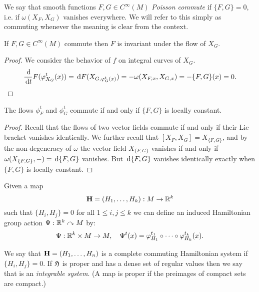 \begin{dfn}
    We say that smooth functions $F,G\in C^\infty(M)$ \emph{Poisson commute} if $\{F,G\}=0$, i.e. if $\omega(X_F,X_G)$ vanishes everywhere.
    We will refer to this simply as commuting whenever the meaning is clear from the context.
\end{dfn}

\begin{lem}
    If $F,G\in C^\infty(M)$ commute then $F$ is invariant under the flow of $X_G$.
\end{lem}

\begin{proof}
    We consider the behavior of $f$ on integral curves of $X_G$.
    \[\frac{\,\mathrm d}{\,\mathrm d t}F(\varphi_{X_G}^t(x))=\,\mathrm d F(X_{G,\varphi_G^t(x)})=-\omega(X_{F,x},X_{G,x})=-\{F,G\}(x)=0.\]
\end{proof}

\begin{lem}
    The flows $\phi_F^t$ and $\phi_G^t$ commute if and only if $\{F,G\}$ is locally constant.
\end{lem}

\begin{proof}
    Recall that the flows of two vector fields commute if and only if their Lie bracket vanishes identically.
    We further recall that $[X_F,X_G]=X_{\{F,G\}}$, and by the non-degeneracy of $\omega$ the vector field $X_{\{F,G\}}$ vanishes if and only if $\omega(X_{\{F,G\}},-)=\,\mathrm d\{F,G\}$ vanishes.
    But $\,\mathrm d\{F,G\}$ vanishes identically exactly when $\{F,G\}$ is locally constant.
\end{proof}

\begin{dfn}
    Given a map 
    \[\mathbf{H}=(H_1,\ldots,H_k):M\to\mathbb{R}^k\]
    such that $\{H_i,H_j\}=0$ for all $1\le i,j\le k$ we can define an induced Hamiltonian group action $\Psi:\mathbb{R}^k\curvearrowright M$ by:
    \[\Psi:\mathbb{R}^k\times M\to M,\quad \Psi^t(x)=\varphi_{H_1}^{t_1}\circ\cdots\circ\varphi_{H_k}^{t_k}(x).\]
\end{dfn}


\begin{dfn}
    We say that $\mathbf{H}=(H_1,\ldots,H_n)$ is a complete commuting Hamiltonian system if $\{H_i,H_j\}=0$.
    If $\mathfrak{H}$ is proper and has a dense set of regular values then we say that is an \emph{integrable system}.
    (A map is proper if the preimages of compact sets are compact.)
\end{dfn}


